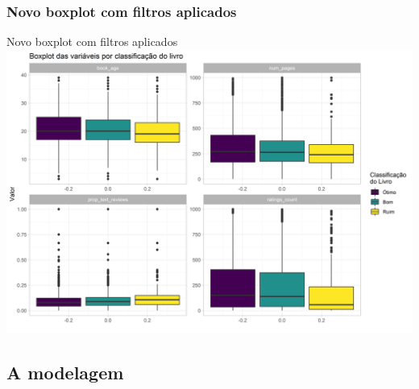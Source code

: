 \documentclass[
  9 pt,
  ignorenonframetext,
]{beamer}
\begin{document}
\hypertarget{novo-boxplot-com-filtros-aplicados}{%
\subsubsection{Novo boxplot com filtros
aplicados}\label{novo-boxplot-com-filtros-aplicados}}

\begin{frame}{Novo boxplot com filtros aplicados}
\includegraphics{apresentacao_files/figure-beamer/unnamed-chunk-11-1.png}
\end{frame}

\hypertarget{a-modelagem}{%
\subsection{A modelagem}\label{a-modelagem}}
\end{document}
